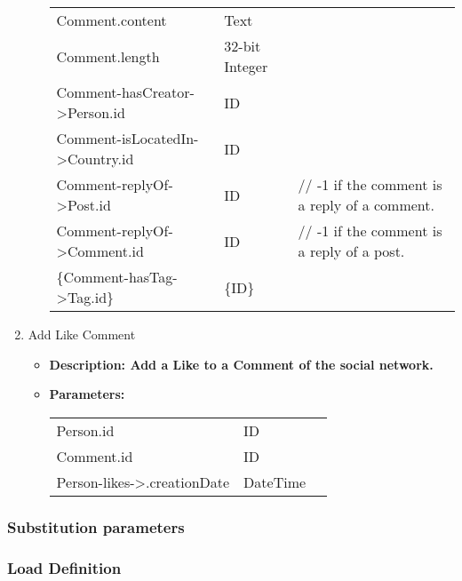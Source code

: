 \begin{enumerate}
\begin{itemize}
\begin{tabular}{lll}
				Comment.content 	 		    & Text & \parbox[t]{20cm}{\par \strut} \\
				Comment.length 	 		    & 32-bit Integer & \parbox[t]{20cm}{\par \strut} \\
                Comment-hasCreator->Person.id & ID & \parbox[t]{20cm}{\par \strut} \\
                Comment-isLocatedIn->Country.id & ID & \parbox[t]{20cm}{\par \strut} \\
                Comment-replyOf->Post.id & ID & \parbox[t]{20cm}{ // -1 if the comment is a reply of a comment. \strut} \\
                Comment-replyOf->Comment.id & ID & \parbox[t]{20cm}{// -1 if the comment is a reply of a post. \strut} \\
                     \{Comment-hasTag->Tag.id\} & \{ID\} & \parbox[t]{20cm}{\par \strut} \\
            \end{tabular}		
    \end{itemize}
    \item Add Like Comment
        \begin{itemize}
		\item \textbf{Description: Add a Like to a Comment of the social network.}
        \item \textbf{Parameters:} \\
			\begin{tabular}{lll}
				Person.id 	 			& ID & \parbox[t]{20cm}{\par \strut} \\
                Comment.id 	 			& ID & \parbox[t]{20cm}{\par \strut} \\
				Person-likes->.creationDate 	 		& DateTime & \parbox[t]{20cm}{\par \strut} \\
            \end{tabular}		
    \end{itemize}
\end{enumerate}

\subsubsection{Substitution parameters}\label{section:substitution}


\subsubsection{Load Definition}\label{section:workload}

